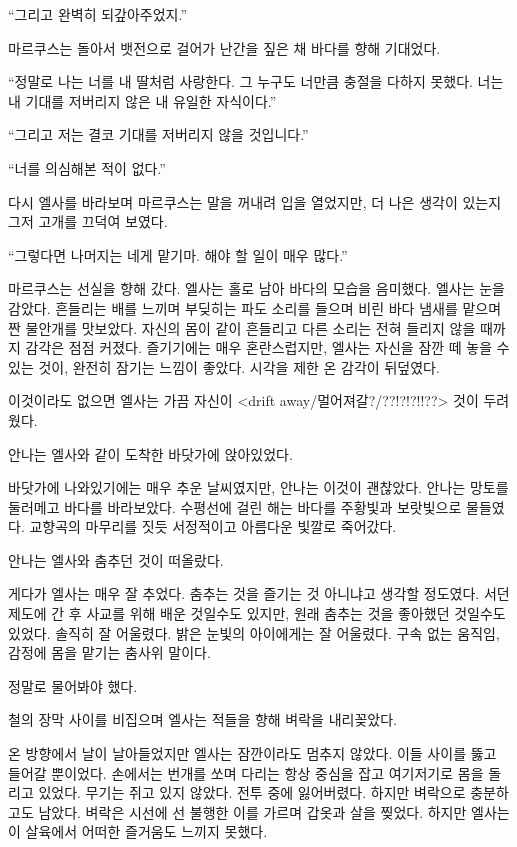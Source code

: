 ``그리고 완벽히 되갚아주었지.'' %

마르쿠스는 돌아서 뱃전으로 걸어가 난간을 짚은 채 바다를 향해 기대었다.

``정말로 나는 너를 내 딸처럼 사랑한다. 그 누구도 너만큼 충절을 다하지 못했다. 너는 내 기대를 저버리지 않은 내 유일한 자식이다.''

``그리고 저는 결코 기대를 저버리지 않을 것입니다.''

`` 너를 의심해본 적이 없다.''

다시 엘사를 바라보며 마르쿠스는 말을 꺼내려 입을 열었지만, 더 나은 생각이 있는지 그저 고개를 끄덕여 보였다.

``그렇다면 나머지는 네게 맡기마. 해야 할 일이 매우 많다.''

마르쿠스는 선실을 향해 갔다. 엘사는 홀로 남아 바다의 모습을 음미했다. 엘사는 눈을 감았다. 흔들리는 배를 느끼며 부딪히는 파도 소리를 들으며 비린 바다 냄새를 맡으며 짠 물안개를 맛보았다. 자신의 몸이 같이 흔들리고 다른 소리는 전혀 들리지 않을 때까지 감각은 점점 커졌다. 즐기기에는 매우 혼란스럽지만, 엘사는 자신을 잠깐 떼 놓을 수 있는 것이, 완전히 잠기는 느낌이 좋았다. 시각을 제한 온 감각이 뒤덮였다. %

이것이라도 없으면 엘사는 가끔 자신이 <drift away/멀어져갈?/??!?!?!!??> 것이 두려웠다.

\textbreak

안나는 엘사와 같이 도착한 바닷가에 앉아있었다.

바닷가에 나와있기에는 매우 추운 날씨였지만, 안나는 이것이 괜찮았다. 안나는 망토를 둘러메고 바다를 바라보았다. 수평선에 걸린 해는 바다를 주황빛과 보랏빛으로 물들였다. 교향곡의 마무리를 짓듯 서정적이고 아름다운 빛깔로 죽어갔다.

안나는 엘사와 춤추던 것이 떠올랐다.

게다가 엘사는 매우 잘 추었다. 춤추는 것을 즐기는 것 아니냐고 생각할 정도였다. 서던 제도에 간 후 사교를 위해 배운 것일수도 있지만, 원래 춤추는 것을 좋아했던 것일수도 있었다. 솔직히 잘 어울렸다. 밝은 눈빛의 아이에게는 잘 어울렸다. 구속 없는 움직임, 감정에 몸을 맡기는 춤사위 말이다.

정말로 물어봐야 했다.

\textbreak

철의 장막 사이를 비집으며 엘사는 적들을 향해 벼락을 내리꽂았다.

온 방향에서 날이 날아들었지만 엘사는 잠깐이라도 멈추지 않았다. 이들 사이를 뚫고 들어갈 뿐이었다. 손에서는 번개를 쏘며 다리는 항상 중심을 잡고 여기저기로 몸을 돌리고 있었다. 무기는 쥐고 있지 않았다. 전투 중에 잃어버렸다. 하지만 벼락으로 충분하고도 남았다. 벼락은 시선에 선 불행한 이를 가르며 갑옷과 살을 찢었다. 하지만 엘사는 이 살육에서 어떠한 즐거움도 느끼지 못했다.

